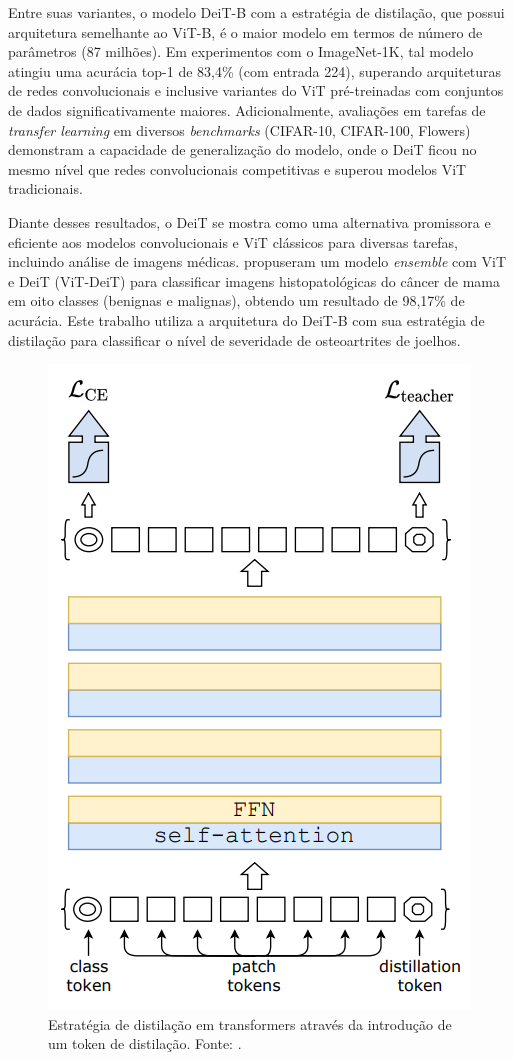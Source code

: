 Entre suas variantes, o modelo DeiT-B com a estratégia de distilação, que possui arquitetura semelhante ao ViT-B, é o maior modelo em termos de número de parâmetros (87 milhões). Em experimentos com o ImageNet-1K, tal modelo atingiu uma acurácia top-1 de 83,4\% (com entrada 224), superando arquiteturas de redes convolucionais e inclusive variantes do ViT pré-treinadas com conjuntos de dados significativamente maiores. Adicionalmente, avaliações em tarefas de \textit{transfer learning} em diversos \textit{benchmarks} (CIFAR-10, CIFAR-100, Flowers) demonstram a capacidade de generalização do modelo, onde o DeiT ficou no mesmo nível que redes convolucionais competitivas e superou modelos ViT tradicionais.

Diante desses resultados, o DeiT se mostra como uma alternativa promissora e eficiente aos modelos convolucionais e ViT clássicos para diversas tarefas, incluindo análise de imagens médicas. \cite{alotaibi2022} propuseram um modelo \textit{ensemble} com ViT e DeiT (ViT-DeiT) para classificar imagens histopatológicas do câncer de mama em oito classes (benignas e malignas), obtendo um resultado de 98,17\% de acurácia. Este trabalho utiliza a arquitetura do DeiT-B com sua estratégia de distilação para classificar o nível de severidade de osteoartrites de joelhos.

\begin{figure}[h]
    \centering
    \includegraphics[width=0.5\linewidth]{figs/distillation-procedure-deit.png}
    \caption{Estratégia de distilação em transformers através da introdução de um token de distilação. Fonte: \cite{Touvron2021}.}
    \label{fig:distillation-procedure}
\end{figure}

